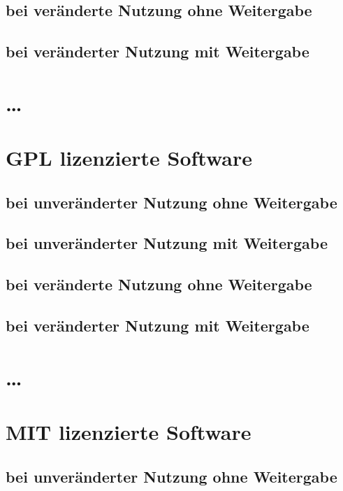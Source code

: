 \documentclass[DIV=calc,BCOR=5mm,11pt,headings=small,oneside,toc=bib]{scrbook}
\begin{document}
\subsection{bei veränderte Nutzung ohne Weitergabe}

\subsection{bei veränderter Nutzung mit Weitergabe}

\section{\ldots}

\section{GPL lizenzierte Software}

\subsection{bei unveränderter Nutzung ohne Weitergabe}

\subsection{bei unveränderter Nutzung mit Weitergabe}

\subsection{bei veränderte Nutzung ohne Weitergabe}

\subsection{bei veränderter Nutzung mit Weitergabe}

\section{\ldots}

\section{MIT lizenzierte Software}

\subsection{bei unveränderter Nutzung ohne Weitergabe}
\end{document}
